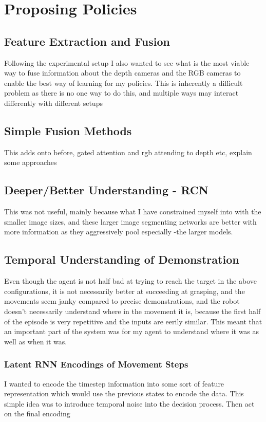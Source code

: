 \section{Proposing Policies}

\subsection{Feature Extraction and Fusion}
Following the experimental setup I also wanted to see what is the most viable way to fuse information about the depth cameras and the RGB cameras to enable the best way of learning for my policies. This is inherently a difficult problem as there is no one way to do this, and multiple ways may interact differently with different setups

\subsection{Simple Fusion Methods}
This adds onto before, gated attention and rgb attending to depth etc, explain some approaches

\subsection{Deeper/Better Understanding - RCN}
This was not useful, mainly because what I have constrained myself into with the smaller image sizes, and these larger image segmenting networks are better with more information as they aggressively pool especially -the larger models. 

\subsection{Temporal Understanding of Demonstration}
Even though the agent is not half bad at trying to reach the target in the above configurations, it is not necessarily better at succeeding at grasping, and the movements seem janky compared to precise demonstrations, and the robot doesn't necessarily understand where in the movement it is, because the first half of the episode is very repetitive and the inputs are eerily similar. This meant that an important part of the system was for my agent to understand where it was as well as when it was.

\subsubsection{Latent RNN Encodings of Movement Steps}
I wanted to encode the timestep information into some sort of feature representation which would use the previous states to encode the data. This simple idea was to introduce temporal noise into the decision process. Then act on the final encoding


